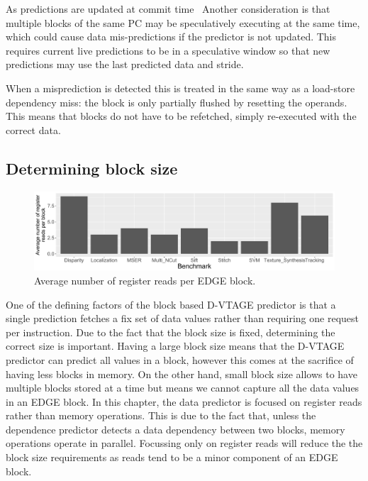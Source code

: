 As predictions are updated at commit time~\cite{paraisBeBop2015}
Another consideration is that multiple blocks of the same PC may be speculatively executing at the same time, which could cause data mis-predictions if the predictor is not updated.
This requires current live predictions to be in a speculative window so that new predictions may use the last predicted data and stride.

When a misprediction is detected this is treated in the same way as a load-store dependency miss: the block is only partially flushed by resetting the operands.
This means that blocks do not have to be refetched, simply re-executed with the correct data.

\subsection{Determining block size}
\begin{figure}[t]
    \centering
    \includegraphics[width=1\textwidth]{chapter3/graphics/averageRegRead.pdf}

    \caption{Average number of register reads per EDGE block.}
    \label{fig:edge_reg_read}
	\vspace{1em}
\end{figure}
One of the defining factors of the block based D-VTAGE predictor is that a single prediction fetches a fix set of data values rather than requiring one request per instruction.
Due to the fact that the block size is fixed, determining the correct size is important.
Having a large block size means that the D-VTAGE predictor can predict all values in a block, however this comes at the sacrifice of having less blocks in memory.
On the other hand, small block size allows to have multiple blocks stored at a time but means we cannot capture all the data values in an EDGE block.
In this chapter, the data predictor is focused on register reads rather than memory operations.
This is due to the fact that, unless the dependence predictor detects a data dependency between two blocks, memory operations operate in parallel.
Focussing only on register reads will reduce the the block size requirements as reads tend to be a minor component of an EDGE block.


